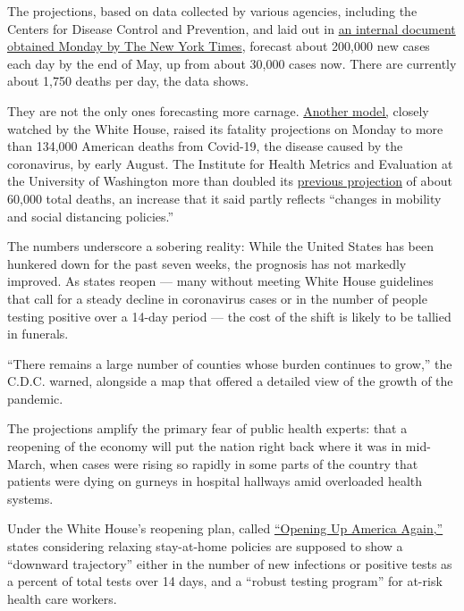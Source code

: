 The projections, based on data collected by various agencies, including
the Centers for Disease Control and Prevention, and laid out in
\href{https://int.nyt.com/data/documenthelper/6926-mayhhsbriefing/af7319f4a55fd0ce5dc9/optimized/full.pdf\#page=1}{an
internal document obtained Monday by The New York Times}, forecast about
200,000 new cases each day by the end of May, up from about 30,000 cases
now. There are currently about 1,750 deaths per day, the data shows.

They are not the only ones forecasting more carnage.
\href{https://covid19.healthdata.org/united-states-of-america}{Another
model,} closely watched by the White House, raised its fatality
projections on Monday to more than 134,000 American deaths from
Covid-19, the disease caused by the coronavirus, by early August. The
Institute for Health Metrics and Evaluation at the University of
Washington more than doubled its
\href{http://www.healthdata.org/news-release/ihme-hold-media-briefing-4-pm-eastern-today-details-below}{previous
projection} of about 60,000 total deaths, an increase that it said
partly reflects ``changes in mobility and social distancing policies.''

The numbers underscore a sobering reality: While the United States has
been hunkered down for the past seven weeks, the prognosis has not
markedly improved. As states reopen --- many without meeting White House
guidelines that call for a steady decline in coronavirus cases or in the
number of people testing positive over a 14-day period --- the cost of
the shift is likely to be tallied in funerals.

``There remains a large number of counties whose burden continues to
grow,'' the C.D.C. warned, alongside a map that offered a detailed view
of the growth of the pandemic.

The projections amplify the primary fear of public health experts: that
a reopening of the economy will put the nation right back where it was
in mid-March, when cases were rising so rapidly in some parts of the
country that patients were dying on gurneys in hospital hallways amid
overloaded health systems.

Under the White House's reopening plan, called
\href{https://www.whitehouse.gov/openingamerica/}{``Opening Up America
Again,''} states considering relaxing stay-at-home policies are supposed
to show a ``downward trajectory'' either in the number of new infections
or positive tests as a percent of total tests over 14 days, and a
``robust testing program'' for at-risk health care workers.

